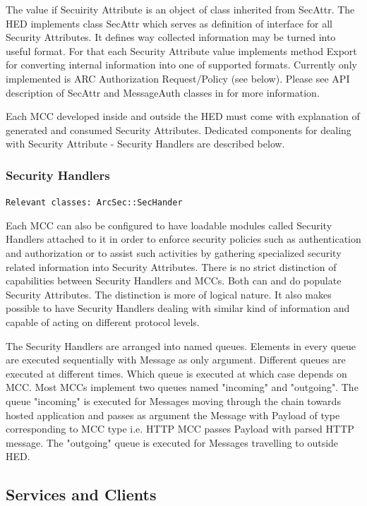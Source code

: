 \documentclass{book}
\begin{document}
The value if Secuirity Attribute is an object of class inherited from SecAttr. The HED implements class SecAttr which serves as definition of interface for all Security Attributes. It defines way collected information may be turned into useful format. For that each Security Attribute value implements method Export for converting internal information into one of supported formats. Currently only implemented is ARC Authorization Request/Policy (see below). Please see API description of SecAttr and MessageAuth classes in \cite{hed-api} for more information.

Each MCC developed inside and outside the HED must come with explanation of generated and consumed Security Attributes. Dedicated components for dealing with Security Attribute - Security Handlers are described below.


\subsubsection{Security Handlers}

\texttt{Relevant classes: ArcSec::SecHander}

Each MCC can also be configured to have loadable modules called Security Handlers attached to it in order to enforce security policies such as authentication and authorization or to assist such activities by gathering specialized security related information into Security Attributes. There is no strict distinction of capabilities between Security Handlers and MCCs. Both can and do populate Security Attributes. The distinction is more of logical nature. It also makes possible to have Security Handlers dealing with similar kind of information and capable of acting on different protocol levels.

The Security Handlers are arranged into named queues. Elements in every queue are executed sequentially with Message as only argument. Different queues are executed at  different times. Which queue is executed at which case depends on MCC. Most MCCs implement two queues named "incoming" and "outgoing". The queue "incoming" is executed for Messages moving through the chain towards hosted application and passes as argument the Message with Payload of type corresponding to MCC type i.e. HTTP MCC passes Payload with parsed HTTP message. The "outgoing" queue is executed for Messages travelling to outside HED.


\subsection{Services and Clients}
\end{document}
